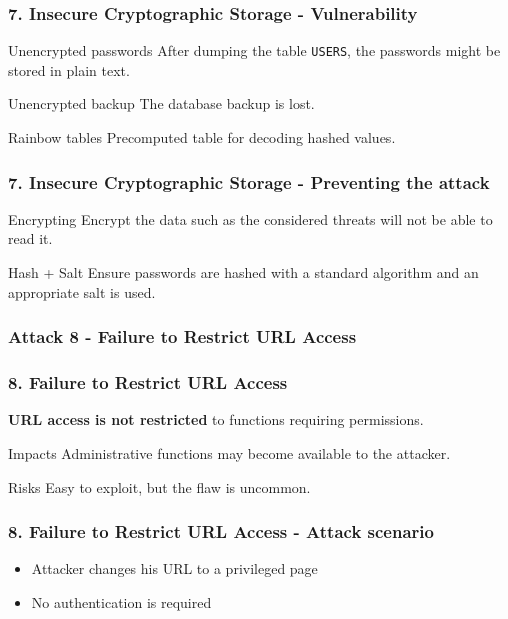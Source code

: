 \begin{frame}
\frametitle{7. Insecure Cryptographic Storage - Vulnerability}
\begin{exampleblock}{Unencrypted passwords}
After dumping the table \texttt{USERS}, the passwords might be stored in
plain text.
\end{exampleblock}
\begin{exampleblock}{Unencrypted backup}
The database backup is lost.
\end{exampleblock}
\begin{exampleblock}{Rainbow tables}
Precomputed table for decoding hashed values.
\end{exampleblock}
\end{frame}

\begin{frame}
\frametitle{7. Insecure Cryptographic Storage - Preventing the attack}
\begin{block}{Encrypting}
Encrypt the data such as the considered threats will not be able to read it.
\end{block}
\begin{block}{Hash + Salt}
Ensure passwords are hashed with a standard algorithm and an appropriate salt
is used.
\end{block}
\end{frame}

\subsubsection{Attack 8 - Failure to Restrict URL Access}

\begin{frame}
\frametitle{8. Failure to Restrict URL Access}
\textbf{URL access is not restricted} to functions requiring permissions.
\begin{block}{Impacts}
Administrative functions may become available to the attacker.
\end{block}
\begin{block}{Risks}
\alert{Easy} to exploit, but the flaw is uncommon.
\end{block}
\end{frame}

\begin{frame}
\frametitle{8. Failure to Restrict URL Access - Attack scenario}
\begin{itemize}
\item Attacker changes his URL to a privileged page
\item No authentication is required
\end{itemize}
\end{frame}

